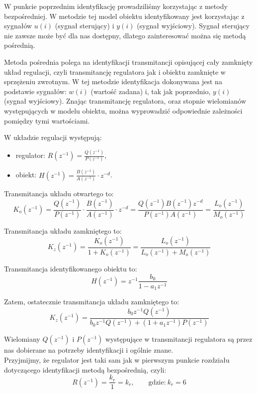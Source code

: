 \documentclass[11pt, a4paper]{article}
\begin{document}
W punkcie poprzednim identyfikację prowadziliśmy korzystając z metody bezpośredniej. W metodzie tej model obiektu identyfikowany jest korzystając z sygnałów $u(i)$ (sygnał sterujący) i $y(i)$ (sygnał wyjściowy). Sygnał sterujący nie zawsze może być dla nas dostępny, dlatego zainteresować można się metodą pośrednią.

Metoda pośrednia polega na identyfikacji transmitancji opisującej cały zamknięty układ regulacji, czyli transmitancję regulatora jak i obiektu zamknięte w sprzężeniu zwrotnym. W tej metodzie identyfikacja dokonywana jest na podstawie sygnałów: $w(i)$ (wartość zadana) i, tak jak poprzednio, $y(i)$ (sygnał wyjściowy). Znając transmitancję regulatora, oraz stopnie wielomianów występujących w modelu obiektu, można wyprowadzić odpowiednie zależności pomiędzy tymi wartościami.

W układzie regulacji występują:
\begin{itemize}
\item regulator: $\displaystyle R(z^{-1}) = \frac{Q(z^{-1})}{P(z^{-1})}$,
\item obiekt: $\displaystyle H(z^{-1}) = \frac{B(z^{-1})}{A(z^{-1})} \cdot z^{-d}$.
\end{itemize}

Transmitancja układu otwartego to:
\[
	K_o(z^{-1}) = \frac{Q(z^{-1})}{P(z^{-1})} \cdot \frac{B(z^{-1})}{A(z^{-1})} \cdot z^{-d} =
		\frac{Q(z^{-1}) B(z^{-1}) z^{-d}}{P(z^{-1}) A(z^{-1})} =
		\frac{L_o(z^{-1})}{M_o(z^{-1})}
\]

Transmitancja układu zamkniętego to:
\[
	K_z(z^{-1}) = \frac{K_o(z^{-1})}{1 + K_o(z^{-1})} =
		\frac{L_o(z^{-1})}{L_o(z^{-1}) + M_o(z^{-1})}
\]

Transmitancja identyfikowanego obiektu to:
\[
	H(z^{-1}) = z^{-1} \frac{b_0}{1 - a_1 z^{-1}}
\]

Zatem, ostatecznie transmitancja układu zamkniętego to:
\[
	K_z(z^{-1}) = \frac{b_0 z^{-1} Q(z^{-1})}{b_0 z^{-1} Q(z^{-1}) + (1 + a_1 z^{-1}) P(z^{-1})}
\]

Wielomiany $Q(z^{-1})$ i $P(z^{-1})$ występujące w transmitancji regulatora są przez nas dobierane na potrzeby identyfikacji i ogólnie znane.\\

Przyjmijmy, że regulator jest taki sam jak w pierwszym punkcie rozdziału dotyczącego identyfikacji metodą bezpośrednią, czyli:
\[
	R(z^{-1}) = \frac{k_r}{1} = k_r, \qquad \text{gdzie:} \ k_r = 6
\]
\end{document}
